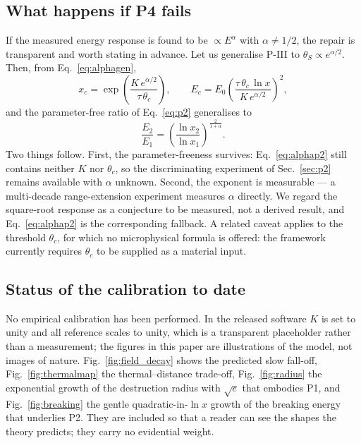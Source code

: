 \documentclass[11pt,a4paper]{article}
\newcommand{\thetaS}{\theta_{S}}
\newcommand{\tgrad}{\tau}
\begin{document}
\subsection{What happens if P4 fails}

If the measured energy response is found to be $\propto E^{\alpha}$ with
$\alpha\neq 1/2$, the repair is transparent and worth stating in advance. Let
us generalise P-III to $\thetaS \propto e^{\alpha/2}$. Then, from
Eq.~\eqref{eq:alphagen},
\begin{equation}
  x_c = \exp\!\left(\frac{K\,e^{\alpha/2}}{\tgrad\,\theta_c}\right),
  \qquad
  E_c = E_0\left(\frac{\tgrad\,\theta_c\,\ln x}{K\,e^{\alpha/2}}\right)^{\!2},
  \label{eq:alphagen}
\end{equation}
and the parameter-free ratio of Eq.~\eqref{eq:p2} generalises to
\begin{equation}
  \frac{E_2}{E_1} = \left(\frac{\ln x_2}{\ln x_1}\right)^{\frac{2}{1+\alpha}} .
  \label{eq:alphap2}
\end{equation}
Two things follow. First, the parameter-freeness survives: Eq.~\eqref{eq:alphap2}
still contains neither $K$ nor $\theta_c$, so the discriminating experiment
of Sec.~\ref{sec:p2} remains available with $\alpha$ unknown. Second, the
exponent is measurable --- a multi-decade range-extension experiment measures
$\alpha$ directly. We regard the square-root response as a conjecture to be
measured, not a derived result, and Eq.~\eqref{eq:alphap2} is the
corresponding fallback. A related caveat applies to the threshold
$\theta_c$, for which no microphysical formula is offered: the framework
currently requires $\theta_c$ to be supplied as a material input.

\subsection{Status of the calibration to date}

No empirical calibration has been performed. In the released software $K$ is
set to unity and all reference scales to unity, which is a transparent
placeholder rather than a measurement; the figures in this paper are
illustrations of the model, not images of nature. Fig.~\ref{fig:field_decay}
shows the predicted slow fall-off, Fig.~\ref{fig:thermalmap} the
thermal--distance trade-off, Fig.~\ref{fig:radius} the exponential growth of
the destruction radius with $\sqrt{e}$ that embodies P1, and
Fig.~\ref{fig:breaking} the gentle quadratic-in-$\ln x$ growth of the
breaking energy that underlies P2. They are included so that a reader can see
the shapes the theory predicts; they carry no evidential weight.
\end{document}
